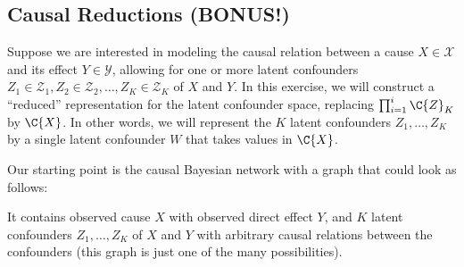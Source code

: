 \subsection{Causal Reductions (BONUS!)}

Suppose we are interested in modeling the causal relation between a cause $X \in \mathcal{X}$ and its effect $Y \in \mathcal{Y}$, allowing for one or more latent confounders $Z_1 \in \mathcal{Z}_1, Z_2 \in \mathcal{Z}_2, \dots, Z_K \in \mathcal{Z}_K$ of $X$ and $Y$.
In this exercise, we will construct a ``reduced'' representation for the latent confounder space, replacing $\prod_{i=1}^i \C{Z}_K$ by $\C{X}$.
In other words, we will represent the $K$ latent confounders $Z_1,\dots,Z_K$ by a single latent confounder $W$ that takes values in $\C{X}$.

Our starting point is the causal Bayesian network with a graph that could look as follows:
\begin{center}\end{center}
It contains observed cause $X$ with observed direct effect $Y$, and $K$ latent confounders $Z_1,\dots,Z_K$ of $X$ and $Y$ with arbitrary causal relations between the confounders (this graph is just one of the many possibilities).

